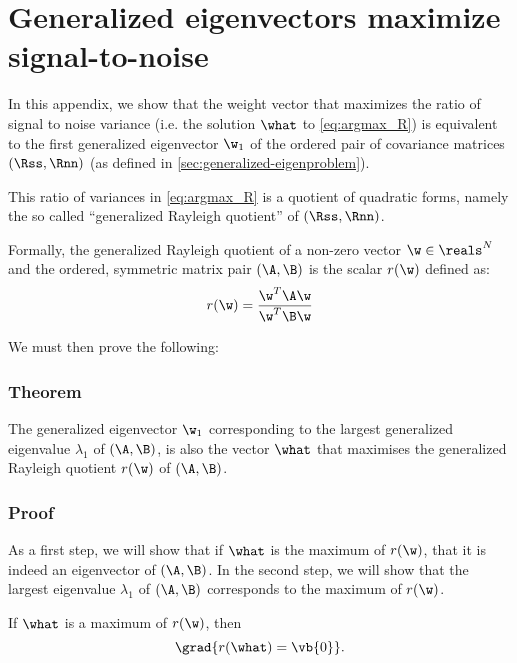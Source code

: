 \chapter{Generalized eigenvectors maximize signal-to-noise}
\label{apx:GEvecs-maximise-SNR}

In this appendix, we show that the weight vector that maximizes the ratio of signal to noise variance (i.e. the solution $\what$ to \cref{eq:argmax_R}) is equivalent to the first generalized eigenvector $\w_1$ of the ordered pair of covariance matrices $(\Rss, \Rnn)$ (as defined in \cref{sec:generalized-eigenproblem}).

This ratio of variances in \cref{eq:argmax_R} is a quotient of quadratic forms, namely the so called ``generalized Rayleigh quotient'' of $(\Rss, \Rnn)$.

Formally, the generalized Rayleigh quotient of a non-zero vector $\w \in \reals^N$ and the ordered, symmetric matrix pair $(\A,\B)$ is the scalar $r(\w)$ defined as:
%
\begin{equation}
\label{eq:Rayleigh}
r(\w) = \frac{\w^T \A \w}
             {\w^T \B \w}
\end{equation}

We must then prove the following:



\subsection{Theorem}

The generalized eigenvector $\w_1$ corresponding to the largest generalized eigenvalue $\lambda_1$ of $(\A,\B)$, is also the vector $\what$ that maximises the generalized Rayleigh quotient $r(\w)$ of $(\A,\B)$.




\subsection{Proof}

As a first step, we will show that if $\what$ is the maximum of $r(\w)$, that it is indeed an eigenvector of $(\A,\B)$. In the second step, we will show that the largest eigenvalue $\lambda_1$ of $(\A,\B)$ corresponds to the maximum of $r(\w)$.

If $\what$ is a maximum of $r(\w)$, then
\begin{equation}
\label{eq:critical}
\grad{r(\what) = \vb{0}}.
\end{equation}

